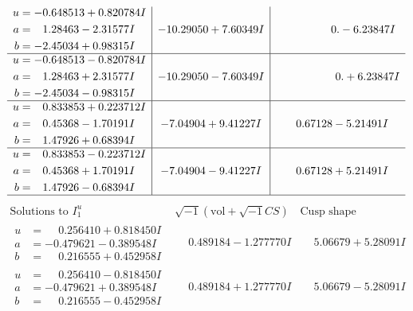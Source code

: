 \documentclass[1p]{elsarticle_modified}
\theoremstyle{definition}
\newcommand{\I}{\sqrt{-1}}
\begin{document}
$$\begin{array}{c|c|c}
\begin{aligned}
u &= -0.648513 + 0.820784 I \\
a &= \phantom{-}1.28463 - 2.31577 I \\
b &= -2.45034 + 0.98315 I\end{aligned}
 & -10.29050 + 7.60349 I & \phantom{-0.000000 } 0. - 6.23847 I \\ \hline\begin{aligned}
u &= -0.648513 - 0.820784 I \\
a &= \phantom{-}1.28463 + 2.31577 I \\
b &= -2.45034 - 0.98315 I\end{aligned}
 & -10.29050 - 7.60349 I & \phantom{-0.000000 -}0. + 6.23847 I \\ \hline\begin{aligned}
u &= \phantom{-}0.833853 + 0.223712 I \\
a &= \phantom{-}0.45368 - 1.70191 I \\
b &= \phantom{-}1.47926 + 0.68394 I\end{aligned}
 & -7.04904 + 9.41227 I & \phantom{-}0.67128 - 5.21491 I \\ \hline\begin{aligned}
u &= \phantom{-}0.833853 - 0.223712 I \\
a &= \phantom{-}0.45368 + 1.70191 I \\
b &= \phantom{-}1.47926 - 0.68394 I\end{aligned}
 & -7.04904 - 9.41227 I & \phantom{-}0.67128 + 5.21491 I\\
 \hline 
 \end{array}$$\newpage$$\begin{array}{c|c|c}  
\text{Solutions to }I^u_{1}& \I (\text{vol} + \sqrt{-1}CS) & \text{Cusp shape}\\
 \hline 
\begin{aligned}
u &= \phantom{-}0.256410 + 0.818450 I \\
a &= -0.479621 - 0.389548 I \\
b &= \phantom{-}0.216555 + 0.452958 I\end{aligned}
 & \phantom{-}0.489184 - 1.277770 I & \phantom{-}5.06679 + 5.28091 I \\ \hline\begin{aligned}
u &= \phantom{-}0.256410 - 0.818450 I \\
a &= -0.479621 + 0.389548 I \\
b &= \phantom{-}0.216555 - 0.452958 I\end{aligned}
 & \phantom{-}0.489184 + 1.277770 I & \phantom{-}5.06679 - 5.28091 I \\ \hline\begin{aligned}

\end{aligned}
\end{array}$$
\end{document}
